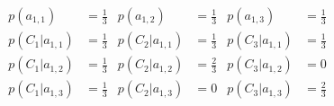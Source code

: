 \begin{equation}
    \begin{aligned}
        p(a_{1,1})&=\frac13
        & p(a_{1,2})&=\frac13
        & p(a_{1,3})&=\frac13
        \\ p(C_1 \vert a_{1,1})&=\frac13
        & p(C_2 \vert a_{1,1})&=\frac13
        & p(C_3 \vert a_{1,1})&=\frac13
        \\ p(C_1 \vert a_{1,2})&=\frac13
        & p(C_2 \vert a_{1,2})&=\frac23
        & p(C_3 \vert a_{1,2})&=0
        \\ p(C_1 \vert a_{1,3})&=\frac13
        & p(C_2 \vert a_{1,3})&=0
        & p(C_3 \vert a_{1,3})&=\frac23
    \end{aligned}
\end{equation}
